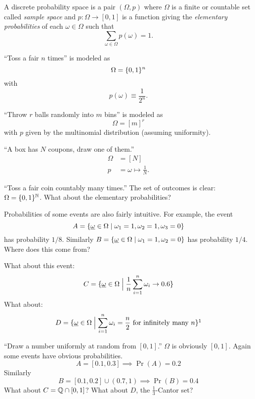 \begin{definition} \label{def:discrete}
    A discrete probability space is a pair $(\Omega, p)$ where
    $\Omega$ is a finite or countable set called \emph{sample space} and
    $p: \Omega \to [0, 1]$ is a function giving the \emph{elementary probabilities}
    of each $\omega \in \Omega$ such that \[
        \sum_{\omega \in \Omega} p(\omega) = 1.
    \]
\end{definition}
\begin{examples}
    \item ``Toss a fair $n$ times'' is modeled as \[
        \Omega = \{0, 1\}^n
    \] with \[
        p(\omega) \equiv \frac{1}{2^n}.
    \]
    \item ``Throw $r$ balls randomly into $m$ bins'' is modeled as \[
        \Omega = [m]^r
    \] with $p$ given by the multinomial distribution (assuming
    uniformity).
    \item ``A box has $N$ coupons, draw one of them.''
    \begin{align*}
        \Omega &= [N] \\
        p &= \omega \mapsto \frac{1}{N}.
    \end{align*}
    \item ``Toss a fair coin countably many times.''
    The set of outcomes is clear: $\Omega = \{0, 1\}^{\mathbb{N}}$.
    What about the elementary probabilities?

    Probabilities of some events are also fairly intuitive.
    For example, the event \[
        A = \{\underline{\omega} \in \Omega
                \mid \omega_1 = 1, \omega_2 = 1, \omega_3 = 0\}
    \] has probability $1/8$.
    Similarly $B = \{\underline{\omega} \in \Omega \mid
                    \omega_1 = 1, \omega_2 = 0\}$ has probability $1/4$.
    Where does this come from?

    What about this event: \[
        C = \{\underline{\omega} \in \Omega
                \Bigm\vert \frac1n \sum_{i=1}^n \omega_i \to 0.6\}
    \]
    What about: \[
        D = \set{\ubar{\omega} \in \Omega
                \Bigm\vert \sum_{i=1}^n \omega_i = \frac{n}{2}
                \text{ for infinitely many } n}\footnotemark
    \] 
    \item ``Draw a number uniformly at random from $[0, 1]$.''
    $\Omega$ is obviously $[0, 1]$.
    Again some events have obvious probabilities.
    \[
        A = [0.1, 0.3] \implies \Pr(A) = 0.2
    \] Similarly \[
        B = [0.1, 0.2] \cup (0.7, 1) \implies \Pr(B) = 0.4
    \] What about $C = \mathbb{Q} \cap [0, 1]$?
    What about $D$, the $\frac13$-Cantor set?


\end{examples}
